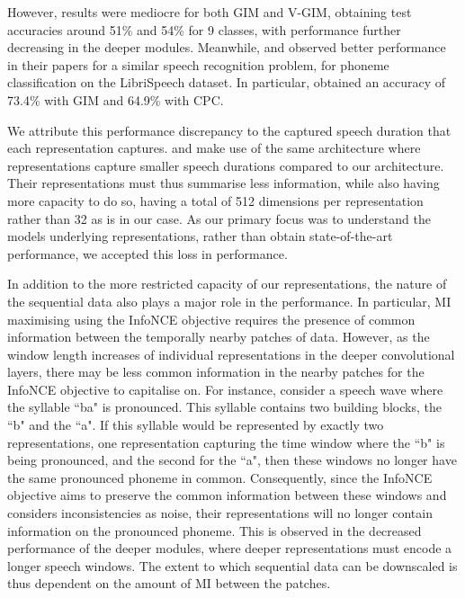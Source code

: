 	However, results were mediocre for both GIM and V-GIM, obtaining test accuracies around 51\% and 54\% for 9 classes, with performance further decreasing in the deeper modules. Meanwhile, \cite{oordRepresentationLearningContrastive2019} and \cite{lowePuttingEndEndtoEnd2020a} observed better performance in their papers for a similar speech recognition problem, for phoneme classification on the LibriSpeech dataset. In particular, \citeauthor{lowePuttingEndEndtoEnd2020a} obtained an accuracy of 73.4\% with GIM and 64.9\% with CPC.
	
	We attribute this performance discrepancy to the captured speech duration that each representation captures. \citeauthor{lowePuttingEndEndtoEnd2020a} and \citeauthor{oordRepresentationLearningContrastive2019} make use of the same architecture where representations capture smaller speech durations compared to our architecture. Their representations must thus summarise less information, while also having more capacity to do so, having a total of 512 dimensions per representation rather than 32 as is in our case. As our primary focus was to understand the models underlying representations, rather than obtain state-of-the-art performance, we accepted this loss in performance.
	
	In addition to the more restricted capacity of our representations, the nature of the sequential data also plays a major role in the performance. In particular, MI maximising using the InfoNCE objective requires the presence of common information between the temporally nearby patches of data. However, as the window length increases of individual representations in the deeper convolutional layers, there may be less common information in the nearby patches for the InfoNCE objective to capitalise on. For instance, consider a speech wave where the syllable ``ba" is pronounced. This syllable contains two building blocks, the ``b" and the ``a". If this syllable would be represented by exactly two
	representations, one representation capturing the time window where the ``b" is being pronounced, and the second for the ``a", then these windows no longer have the same pronounced phoneme in common. Consequently, since the InfoNCE objective aims to preserve the common information between these windows and considers inconsistencies as noise, their representations will no longer contain information on the pronounced phoneme. This is observed in the decreased performance of the deeper modules, where deeper representations must encode a longer speech windows. The extent to which sequential data can be downscaled is thus dependent on the amount of MI between the patches.
	
